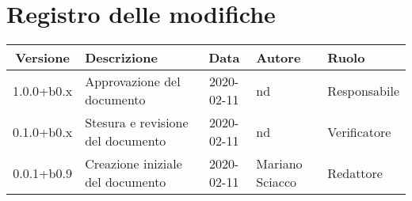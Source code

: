 \section*{Registro delle modifiche}

\begin{center}
	\begin{longtable}{|c|p{3.5cm}|c|p{3cm}|p{3cm}|}
	\hline
	\rowcolor{lighter-grayer}
	\textbf{Versione} & \textbf{Descrizione} & \textbf{Data} & \textbf{Autore} & \textbf{Ruolo} \\
	\hline
	\endfirsthead


	1.0.0+b0.x & Approvazione del documento & 2020-02-11 & nd & Responsabile \\
	\hline
	0.1.0+b0.x & Stesura e revisione del documento & 2020-02-11 & nd & Verificatore \\
	\hline
	0.0.1+b0.9 & Creazione iniziale del documento & 2020-02-11 & Mariano Sciacco & Redattore \\
	\hline

	\end{longtable}
\end{center}